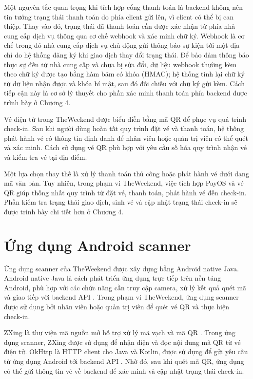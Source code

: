 \documentclass[../DoAn.tex]{subfiles}
\begin{document}
Một nguyên tắc quan trọng khi tích hợp cổng thanh toán là backend không nên tin tưởng trạng thái thanh toán do phía client gửi lên, vì client có thể bị can thiệp. Thay vào đó, trạng thái đã thanh toán cần được xác nhận từ phía nhà cung cấp dịch vụ thông qua cơ chế webhook và xác minh chữ ký. Webhook là cơ chế trong đó nhà cung cấp dịch vụ chủ động gửi thông báo sự kiện tới một địa chỉ do hệ thống đăng ký khi giao dịch thay đổi trạng thái. Để bảo đảm thông báo thực sự đến từ nhà cung cấp và chưa bị sửa đổi, dữ liệu webhook thường kèm theo chữ ký được tạo bằng hàm băm có khóa (HMAC); hệ thống tính lại chữ ký từ dữ liệu nhận được và khóa bí mật, sau đó đối chiếu với chữ ký gửi kèm. Cách tiếp cận này là cơ sở lý thuyết cho phần xác minh thanh toán phía backend được trình bày ở Chương 4.

Vé điện tử trong TheWeekend được biểu diễn bằng mã QR để phục vụ quá trình check-in. Sau khi người dùng hoàn tất quy trình đặt vé và thanh toán, hệ thống phát hành vé có thông tin định danh để nhân viên hoặc quản trị viên có thể quét và xác minh. Cách sử dụng vé QR phù hợp với yêu cầu số hóa quy trình nhận vé và kiểm tra vé tại địa điểm.

Một lựa chọn thay thế là xử lý thanh toán thủ công hoặc phát hành vé dưới dạng mã văn bản. Tuy nhiên, trong phạm vi TheWeekend, việc tích hợp PayOS và vé QR giúp thống nhất quy trình từ đặt vé, thanh toán, phát hành vé đến check-in. Phần kiểm tra trạng thái giao dịch, sinh vé và cập nhật trạng thái check-in sẽ được trình bày chi tiết hơn ở Chương 4.

\section{Ứng dụng Android scanner}

Ứng dụng scanner của TheWeekend được xây dựng bằng Android native Java. Android native Java là cách phát triển ứng dụng trực tiếp trên nền tảng Android, phù hợp với các chức năng cần truy cập camera, xử lý kết quả quét mã và giao tiếp với backend API \cite{android_docs}. Trong phạm vi TheWeekend, ứng dụng scanner được sử dụng bởi nhân viên hoặc quản trị viên để quét vé QR và thực hiện check-in.

ZXing là thư viện mã nguồn mở hỗ trợ xử lý mã vạch và mã QR \cite{zxing_repo}. Trong ứng dụng scanner, ZXing được sử dụng để nhận diện và đọc nội dung mã QR từ vé điện tử. OkHttp là HTTP client cho Java và Kotlin, được sử dụng để gửi yêu cầu từ ứng dụng Android tới backend API \cite{okhttp_docs}. Nhờ đó, sau khi quét mã QR, ứng dụng có thể gửi thông tin vé về backend để xác minh và cập nhật trạng thái check-in.
\end{document}
